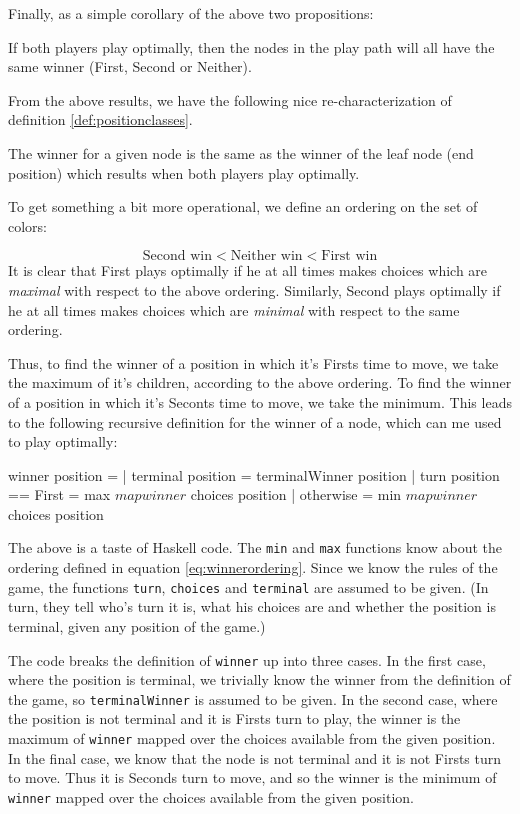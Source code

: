 Finally, as a simple corollary of the above two propositions:

\begin{proposition}
If both players play optimally, then the nodes in the play path will all have the same winner (First, Second or Neither).
\end{proposition}
From the above results, we have the following nice re-characterization of definition \ref{def:positionclasses}.

\begin{theorem}
The winner for a given node is the same as the winner of the leaf node (end position) which results when both players play optimally.
\end{theorem}
To get something a bit more operational, we define an ordering on the set of colors:

\begin{equation}
\label{eq:winnerordering}
  \text{Second win} < \text{Neither win} < \text{First win}
\end{equation}
It is clear that First plays optimally if he at all times makes choices which are \emph{maximal} with respect to the above ordering.
Similarly, Second plays optimally if he at all times makes choices which are \emph{minimal} with respect to the same ordering.

Thus, to find the winner of a position in which it's Firsts time to move, we take the maximum of it's children, according to the above ordering.
To find the winner of a position in which it's Seconts time to move, we take the minimum.
This leads to the following recursive definition for the winner of a node, which can me used to play optimally:

\begin{code}
  winner position =
    | terminal position       = terminalWinner position
    | turn position == First  = max $ map winner $ choices position
    | otherwise               = min $ map winner $ choices position
\end{code}
The above is a taste of Haskell code.
The \texttt{min} and \texttt{max} functions know about the ordering defined in equation \ref{eq:winnerordering}.
Since we know the rules of the game, the functions \texttt{turn}, \texttt{choices} and \texttt{terminal} are assumed to be given.
(In turn, they tell who's turn it is, what his choices are and whether the position is terminal, given any position of the game.)

The code breaks the definition of \texttt{winner} up into three cases.
In the first case, where the position is terminal, we trivially know the winner from the definition of the game, so \texttt{terminalWinner} is assumed to be given.
In the second case, where the position is not terminal and it is Firsts turn to play, the winner is the maximum of \texttt{winner} mapped over the choices available from the given position.
In the final case, we know that the node is not terminal and it is not Firsts turn to move. Thus it is Seconds turn to move, and so the winner is the minimum of \texttt{winner} mapped over the choices available from the given position.

